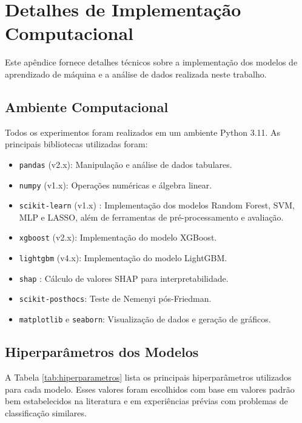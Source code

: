 \documentclass[12pt, a4paper, oneside]{report}
\begin{document}
\appendix
\chapter{Detalhes de Implementação Computacional}
\label{app:implementacao}

Este apêndice fornece detalhes técnicos sobre a implementação dos modelos de aprendizado de máquina e a análise de dados realizada neste trabalho.

\section{Ambiente Computacional}

Todos os experimentos foram realizados em um ambiente Python 3.11. As principais bibliotecas utilizadas foram:

\begin{itemize}
    \item \texttt{pandas} (v2.x): Manipulação e análise de dados tabulares.
    \item \texttt{numpy} (v1.x): Operações numéricas e álgebra linear.
    \item \texttt{scikit-learn} (v1.x) \cite{pedregosa2011}: Implementação dos modelos Random Forest, SVM, MLP e LASSO, além de ferramentas de pré-processamento e avaliação.
    \item \texttt{xgboost} (v2.x): Implementação do modelo XGBoost.
    \item \texttt{lightgbm} (v4.x): Implementação do modelo LightGBM.
    \item \texttt{shap} \cite{lundberg2017}: Cálculo de valores SHAP para interpretabilidade.
    \item \texttt{scikit-posthocs}: Teste de Nemenyi pós-Friedman.
    \item \texttt{matplotlib} e \texttt{seaborn}: Visualização de dados e geração de gráficos.
\end{itemize}

\section{Hiperparâmetros dos Modelos}

A Tabela \ref{tab:hiperparametros} lista os principais hiperparâmetros utilizados para cada modelo. Esses valores foram escolhidos com base em valores padrão bem estabelecidos na literatura e em experiências prévias com problemas de classificação similares.
\end{document}
